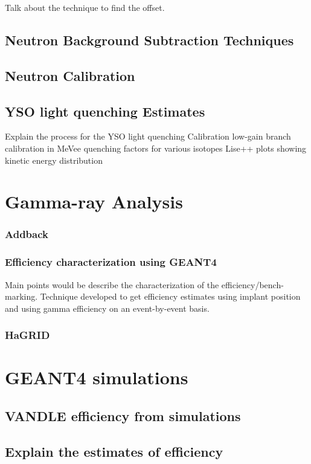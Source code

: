Talk about the technique to find the offset.

\subsection{Neutron Background Subtraction Techniques}
\subsection{Neutron Calibration}
\subsection{YSO light quenching Estimates}

Explain the process for the YSO light quenching
Calibration
low-gain branch calibration in MeVee
quenching factors for various isotopes 
Lise++ plots showing kinetic energy distribution

\section{Gamma-ray Analysis}
\subsubsection{Addback}
\subsubsection{Efficiency characterization using GEANT4}
Main points would be describe the characterization of the efficiency/bench-marking.
Technique developed to get efficiency estimates using implant position and using gamma efficiency on an event-by-event basis. 
\subsubsection{HaGRID}

\section{GEANT4 simulations}

\subsection{VANDLE efficiency from simulations}

\subsection{Explain the estimates of efficiency}
